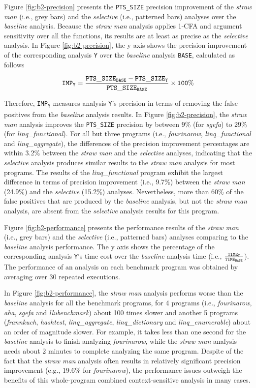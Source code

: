 Figure \ref{fig:b2-precision} presents the {\tt PTS\_SIZE} precision improvement of the {\it straw man} (i.e., grey bars) and the {\it selective} (i.e., patterned bars) analyses over the {\it baseline} analysis. Because the {\it straw man} analysis applies 1-CFA and argument sensitivity over all the functions, its results are at least as precise as the {\it selective} analysis. In Figure \ref{fig:b2-precision}, the y axis shows the precision improvement of the corresponding analysis {\tt Y} over the {\it baseline} analysis {\tt BASE}, calculated as follows

\[
  {\tt IMP_{Y} = {{PTS\_SIZE_{BASE} - PTS\_SIZE_{Y}} \over {PTS\_SIZE_{BASE}}} \times 100\%}
\]

Therefore, {\tt IMP\textsubscript{Y}} measures analysis {\tt Y}'s precision in terms of removing the false positives from the {\it baseline} analysis results. In Figure \ref{fig:b2-precision}, the {\it straw man} analysis improves the {\tt PTS\_SIZE} precision by between 9\% (for {\it sgefa}) to 29\% (for {\it linq\_functional}). For all but three programs (i.e., {\it fourinarow}, {\it linq\_functional} and {\it linq\_aggregate}), the differences of the precision improvement percentages are within 3.2\% between the {\it straw man} and the {\it selective} analyses, indicating that the {\it selective} analysis produces similar results to the {\it straw man} analysis for most programs. The results of the {\it linq\_functional} program exhibit the largest difference in terms of precision improvement (i.e., 9.7\%) between the {\it straw man} (24.9\%) and the {\it selective} (15.2\%) analyses. Nevertheless, more than 60\% of the false positives that are produced by the {\it baseline} analysis, but not the {\it straw man} analysis, are absent from the {\it selective} analysis results for this program.

Figure \ref{fig:b2-performance} presents the performance results of the {\it straw man} (i.e., grey bars) and the {\it selective} (i.e., patterned bars) analyses comparing to the {\it baseline} analysis performance. The y axis shows the percentage of the corresponding analysis {\tt Y}'s time cost over the {\it baseline} analysis time (i.e., ${\tt \frac{TIME_{Y}}{TIME_{BASE}}}$). The performance of an analysis on each benchmark program was obtained by averaging over 30 repeated executions.

In Figure \ref{fig:b2-performance}, the {\it straw man} analysis performs worse than the {\it baseline} analysis for all the benchmark programs, for 4 programs (i.e., {\it fourinarow}, {\it aha}, {\it sgefa} and {\it llubenchmark}) about 100 times slower and another 5 programs ({\it frannkuch}, {\it hashtest}, {\it linq\_aggregate}, {\it linq\_dictionary} and {\it linq\_enumerable}) about an order of magnitude slower. For example, it takes less than one second for the {\it baseline} analysis to finish analyzing {\it fourinarow}, while the {\it straw man} analysis needs about 2 minutes to complete analyzing the same program. Despite of the fact that the {\it straw man} analysis often results in relatively significant precision improvement (e.g., 19.6\% for {\it fourinarow}), the performance issues outweigh the benefits of this whole-program combined context-sensitive analysis in many cases.

